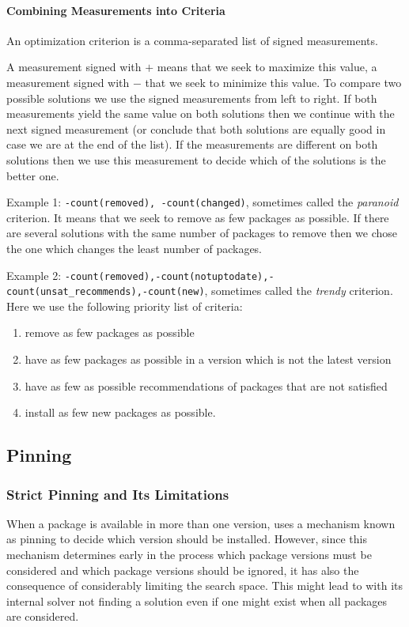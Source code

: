 \paragraph{Combining Measurements into Criteria}
An optimization criterion is a comma-separated list of signed measurements.

A measurement signed with $+$ means that we seek to maximize this
value, a measurement signed with $-$ that we seek to minimize this
value. To compare two possible solutions we use the signed
measurements from left to right.  If both measurements yield the same
value on both solutions then we continue with the next signed
measurement (or conclude that both solutions are equally good in case
we are at the end of the list). If the measurements are different on
both solutions then we use this measurement to decide which of the
solutions is the better one.

Example 1: \texttt{-count(removed), -count(changed)}, sometimes called
the \emph{paranoid} criterion. It means that we seek to remove as few
packages as possible. If there are several solutions with the same
number of packages to remove then we chose the one which changes the least
number of packages.

Example 2: \texttt{-count(removed),-count(notuptodate),-count(unsat\_recommends),-count(new)},
sometimes called the \emph{trendy} criterion. Here we use the
following priority list of criteria:
\begin{enumerate}
\item remove as few packages as possible
\item have as few packages as possible in a version which is not the latest
  version
\item have as few as possible recommendations of packages that are not satisfied
\item install as few new packages as possible.
\end{enumerate}

\subsection{Pinning}

\subsubsection{Strict Pinning and Its Limitations}
When a package is available in more than one version, \aptget{} uses a
mechanism known as pinning to decide which version should be
installed. However, since this mechanism determines early in the
process which package versions must be considered and which package
versions should be ignored, it has also the consequence of
considerably limiting the search space. This might lead to \aptget{}
with its internal solver not finding a solution even if one might
exist when all packages are considered.

